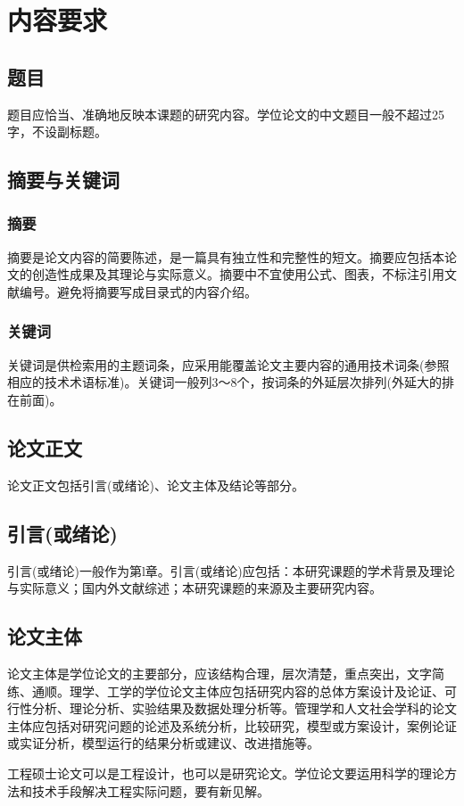 \chapter{内容要求}

\section{题目}
题目应恰当、准确地反映本课题的研究内容。学位论文的中文题目一般不超过25字，不设副标题。
\section{摘要与关键词}
\subsection{摘要}
摘要是论文内容的简要陈述，是一篇具有独立性和完整性的短文。摘要应包括本论文的创造性成果及其理论与实际意义。摘要中不宜使用公式、图表，不标注引用文献编号。避免将摘要写成目录式的内容介绍。
\subsection{关键词}
关键词是供检索用的主题词条，应采用能覆盖论文主要内容的通用技术词条(参照相应的技术术语标准)。关键词一般列3～8个，按词条的外延层次排列(外延大的排在前面)。

\section{论文正文}
论文正文包括引言(或绪论)、论文主体及结论等部分。
\section{引言(或绪论)}
引言(或绪论)一般作为第l章。引言(或绪论)应包括：本研究课题的学术背景及理论与实际意义；国内外文献综述；本研究课题的来源及主要研究内容。
\section{论文主体}
论文主体是学位论文的主要部分，应该结构合理，层次清楚，重点突出，文字简练、通顺。理学、工学的学位论文主体应包括研究内容的总体方案设计及论证、可行性分析、理论分析、实验结果及数据处理分析等。管理学和人文社会学科的论文主体应包括对研究问题的论述及系统分析，比较研究，模型或方案设计，案例论证或实证分析，模型运行的结果分析或建议、改进措施等。\par
工程硕士论文可以是工程设计，也可以是研究论文。学位论文要运用科学的理论方法和技术手段解决工程实际问题，要有新见解。
